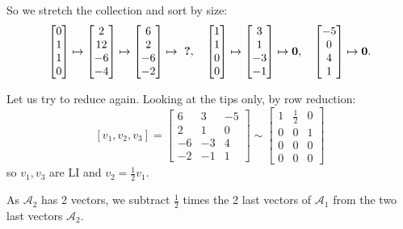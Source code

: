 \documentclass[12pt]{article}
\newcommand{\1}{\mathbf{1}}
\newcommand{\0}{\mathbf{0}}
\newcommand{\A}{\mathcal{A}}
\theoremstyle{definition}
\begin{document}
So we stretch the collection and sort by size:
\[
\left[\begin{matrix}0 \\ 1 \\ 1 \\ 0\end{matrix}\right]
\mapsto
\left[\begin{matrix}2 \\ 12 \\ -6 \\ -4\end{matrix}\right]
\mapsto
\left[\begin{matrix}6\\2\\-6\\-2\end{matrix}\right]
\mapsto
\text{ \bf ?}
,\ \ \
\left[\begin{matrix}1 \\ 1 \\ 0 \\ 0\end{matrix}\right]
\mapsto
\left[\begin{matrix}3 \\ 1 \\ -3 \\ -1\end{matrix}\right]
\mapsto
\0
,\ \ \
\left[\begin{matrix}-5\\0\\4\\1\end{matrix}\right]
\mapsto
\0
.
\]

Let us try to reduce again.
Looking at the tips only, by row reduction:
\[
[v_1, v_2, v_3] =
\left[\begin{matrix}6 & 3 & -5\\2 & 1 & 0\\-6 & -3 & 4\\-2 & -1 & 1\end{matrix}\right]
\sim
\left[\begin{matrix}1 & \frac{1}{2} & 0\\0 & 0 & 1\\0 & 0 & 0\\0 & 0 & 0\end{matrix}\right]
\]
so $v_1,v_3$ are LI and $v_2 = \frac{1}{2} v_1$.

As $\A_2$ has 2 vectors, we subtract $\frac{1}{2}$ times the 2 last vectors of $\A_1$
from the two last vectors $\A_2$.
\end{document}
